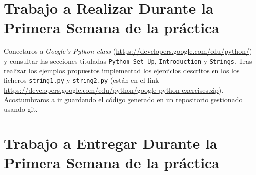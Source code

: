 \documentclass[12pt]{article} %
\begin{document}

\section{Trabajo a Realizar Durante la Primera Semana de la práctica}
Conectaros a \textit{Google’s Python class} (\url{https://developers.google.com/edu/python/}) y consultar  las secciones tituladas \texttt{Python Set  Up}, \texttt{Introduction} y  \texttt{Strings}. Tras realizar los ejemplos propuestos implementad  los ejercicios descritos en los los ficheros \texttt{string1.py} y \texttt{string2.py} (están en el link \url{https://developers.google.com/edu/python/google-python-exercises.zip}). Acostumbraros a ir guardando el código generado en un repositorio gestionado usando git.

\section{Trabajo a Entregar Durante la Primera Semana de la práctica}
\end{document}
